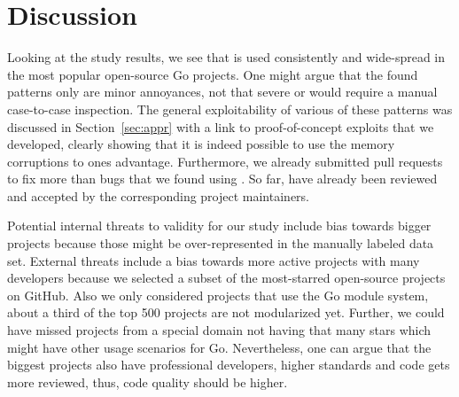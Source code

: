 \section{Discussion}
\label{sec:discussion}

Looking at the study results, we see that \unsafe{} is used consistently and wide-spread in the most popular open-source Go projects.
One might argue that the found patterns only are minor annoyances, not that severe or would require a manual case-to-case inspection. 
The general exploitability of various of these patterns was discussed in Section~\ref{sec:appr} with a link to proof-of-concept exploits that we developed, clearly showing that it is indeed possible to use the memory corruptions to ones advantage.
Furthermore, we already submitted \numberPRs{} pull requests to fix more than \numberBugsFixed{} bugs that we found using \toolSA{}.
So far, \numberPRsMerged{} have already been reviewed and accepted by the corresponding project maintainers.



Potential internal threats to validity for our study include bias towards bigger projects because those might be over-represented in the manually labeled data set. 
External threats include a bias towards more active projects with many developers because we selected a subset of the most-starred open-source projects on GitHub. 
Also we only considered projects that use the Go module system, about a third of the top 500 projects are not modularized yet.
Further, we could have missed projects from a special domain not having that many stars which might have other usage scenarios for \unsafe{} Go.
Nevertheless, one can argue that the biggest projects also have professional developers, higher standards and code gets more reviewed, thus, code quality should be higher.

